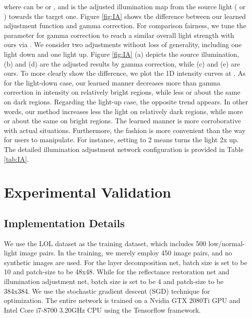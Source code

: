 \documentclass[journal,10pt,compsoc]{IEEEtran}
\begin{document}
where  can be  or , and  is the adjusted illumination map from the source light ( or ) towards the target one. Figure \ref{fig:IA} shows the difference between our learned adjustment function and gamma correction. For comparison fairness, we tune the parameter  for gamma correction to reach a similar overall light strength with ours via . We consider two adjustments without loss of generality, including one light down and one light up. Figure \ref{fig:IA} (a) depicts the source illumination, (b) and (d) are the adjusted results by gamma correction, while (c) and (e) are ours. To more clearly show the difference, we plot the 1D intensity curves at . As for the light-down case, our learned manner decreases more than gamma correction in intensity on relatively bright regions, while less or about the same on dark regions. Regarding the light-up case, the opposite trend appears. In other words, our method increases less the light on relatively dark regions, while more or about the same on bright regions. The learned manner is more corroborative with actual situations. Furthermore, the  fashion is more convenient than the  way for users to manipulate. For instance, setting  to 2 means turns the light 2x up. The detailed illumination adjustment network configuration is provided in Table \ref{tab:IA}.



\section{Experimental Validation}





\subsection{Implementation Details}

We use the LOL dataset as the training dataset, which includes 500 low/normal-light image pairs. In the training, we merely employ 450 image pairs, and no synthetic images are used. For the layer decomposition net, batch size is set to be 10 and patch-size to be 48x48. While for the reflectance restoration net and illumination adjustment net, batch size is set to be 4 and patch-size to be 384x384. We use the stochastic gradient descent (SGD) technique for optimization. The entire network is trained on a Nvidia GTX 2080Ti GPU and Intel Core i7-8700 3.20GHz CPU using the Tensorflow framework. 
\end{document}
